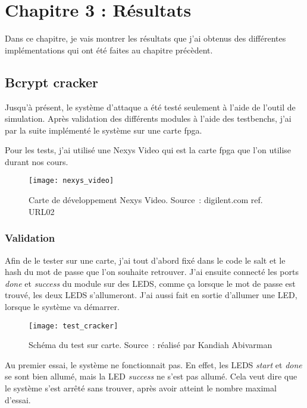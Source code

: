 \chapter{Chapitre 3 : Résultats}

Dans ce chapitre, je vais montrer les résultats que j'ai obtenus des différentes implémentations qui ont été faites au chapitre précèdent.  

\section{Bcrypt cracker}

Jusqu'à présent, le système d'attaque a été testé seulement à l'aide de l'outil de simulation. 
Après validation des différents modules à l'aide des testbenchs, j'ai par la suite implémenté le système sur une carte \gls{fpga}.

Pour les tests, j'ai utilisé une Nexys Video qui est la carte \gls{fpga} que l'on utilise durant nos cours.

\begin{figure}[tbph!]
	\centering
	\texttt{[image: nexys\_video]}
	\caption[Carte de développement Nexys Video]{Carte de développement Nexys Video. Source : digilent.com ref. URL02}
	\label{fig:nexys_video}
\end{figure}

\subsection{Validation}

Afin de le tester sur une carte, j'ai tout d'abord fixé dans le code le salt et le hash du mot de passe que l'on souhaite retrouver.
J'ai ensuite connecté les ports \textit{done} et \textit{success} du module sur des LEDS, comme ça lorsque le mot de passe est trouvé, les deux LEDS s'allumeront.
J'ai aussi fait en sortie d'allumer une LED, lorsque le système va démarrer.

\begin{figure}[tbph!]
	\centering
	\texttt{[image: test\_cracker]}
	\caption[Schéma du test sur carte]{Schéma du test sur carte. Source : réalisé par Kandiah Abivarman}
	\label{fig:test_cracker}
\end{figure}

Au premier essai, le système ne fonctionnait pas. En effet, les LEDS \textit{start} et \textit{done} se sont bien allumé, mais la LED \textit{success} ne s'est pas allumé.
Cela veut dire que le système s'est arrêté sans trouver, après avoir atteint le nombre maximal d'essai.

